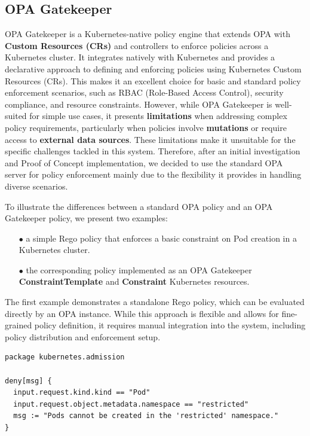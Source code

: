 \newpage

\subsection{OPA Gatekeeper}

OPA Gatekeeper is a Kubernetes-native policy engine that extends OPA with \textbf{Custom Resources (CRs)} and controllers to enforce policies across a Kubernetes cluster. It integrates natively with Kubernetes and provides a declarative approach to defining and enforcing policies using Kubernetes Custom Resources (CRs). This makes it an excellent choice for basic and standard policy enforcement scenarios, such as RBAC (Role-Based Access Control), security compliance, and resource constraints.
However, while OPA Gatekeeper is well-suited for simple use cases, it presents \textbf{limitations} when addressing complex policy requirements, particularly when policies involve \textbf{mutations} or require access to \textbf{external data sources}. These limitations make it unsuitable for the specific challenges tackled in this system. Therefore, after an initial investigation and Proof of Concept implementation, we decided to use the standard OPA server for policy enforcement mainly due to the flexibility it provides in handling diverse scenarios.

To illustrate the differences between a standard OPA policy and an OPA Gatekeeper policy, we present two examples:  
\begin{itemize}[itemsep=0.2pt, topsep=1pt]
  \item[$\bullet$] a simple Rego policy that enforces a basic constraint on Pod creation in a Kubernetes cluster.
  \item[$\bullet$] the corresponding policy implemented as an OPA Gatekeeper \textbf{ConstraintTemplate} and \textbf{Constraint} Kubernetes resources.
\end{itemize}

The first example demonstrates a standalone Rego policy, which can be evaluated directly by an OPA instance. While this approach is flexible and allows for fine-grained policy definition, it requires manual integration into the system, including policy distribution and enforcement setup.  

\lstset{style=python}
\begin{lstlisting}[language=rego, caption={Simple OPA Rego Policy}, label={lst:opa-rego}]
package kubernetes.admission

deny[msg] {
  input.request.kind.kind == "Pod"
  input.request.object.metadata.namespace == "restricted"
  msg := "Pods cannot be created in the 'restricted' namespace."
}
\end{lstlisting}

